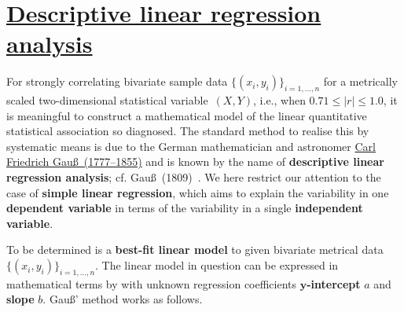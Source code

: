 \chapter[Descriptive linear regression analysis]{\href{https://www.youtube.com/watch?v=uMpJZ2g0e3E}{Descriptive linear regression analysis}}
For strongly correlating bivariate sample data 
$\{(x_{i},y_{i})\}_{i=1,\ldots,n}$ for a metrically scaled 
two-dimensional statistical variable~$(X,Y)$, i.e., when $0.71 
\leq |r| \leq 1.0$, it is meaningful to construct a mathematical 
model of the linear quantitative statistical association so 
diagnosed. The standard method to realise this by systematic means 
is due to the German mathematician and astronomer 
\href{http://www-groups.dcs.st-and.ac.uk/~history/Biographies/Gauss.html}{Carl Friedrich Gau\ss\ (1777--1855)} and is known by the 
name of \textbf{descriptive linear regression analysis};
cf. Gau\ss\ (1809)~. We here restrict our attention to
the case of \textbf{simple linear regression}, which aims to
explain the variability in one \textbf{dependent variable} in terms
of the variability in a single \textbf{independent variable}.

\medskip
\noindent
To be determined is a \textbf{best-fit linear model} to given 
bivariate metrical data
$\{(x_{i},y_{i})\}_{i=1,\ldots,n}$. The linear model in question 
can be expressed in mathematical terms by
%
\be
{}
\ee
%
with unknown regression coefficients
\textbf{$\boldsymbol{y}$-intercept} $a$ and \textbf{slope} $b$.
Gau\ss' method works as follows.

